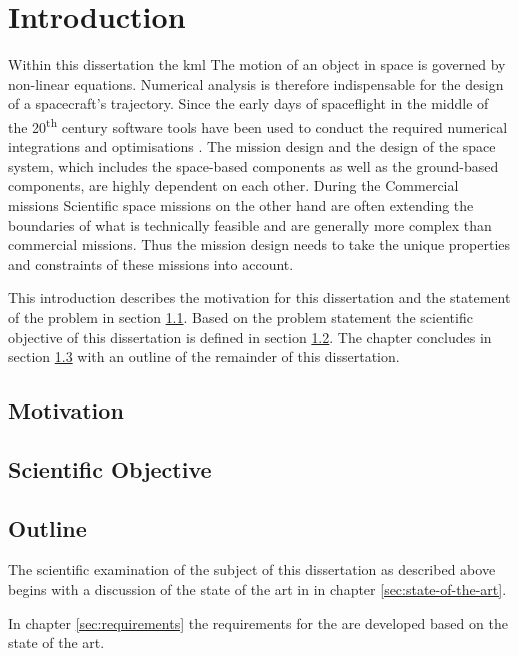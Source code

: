 \chapter{Introduction}
\label{sec:introduction}
Within this dissertation the \ac{kml}
The motion of an object in space is governed by non-linear equations.
Numerical analysis is therefore indispensable for the design of a spacecraft's trajectory.
Since the early days of spaceflight in the middle of the 20\textsuperscript{th} century software tools have been used to conduct the required numerical integrations and optimisations .
The mission design and the design of the space system, which includes the space-based components as well as the ground-based components, are highly dependent on each other.
During the 
Commercial missions
Scientific space missions on the other hand are often extending the boundaries of what is technically feasible and are generally more complex than commercial missions.
Thus the mission design needs to take the unique properties and constraints of these missions into account.



This introduction describes the motivation for this dissertation and the statement of the problem in section \ref{sec:motivation}.
Based on the problem statement the scientific objective of this dissertation is defined in section \ref{sec:scientific-objective}.
The chapter concludes in section \ref{sec:outline} with an outline of the remainder of this dissertation.

\section{Motivation}
\label{sec:motivation}

\section{Scientific Objective}
\label{sec:scientific-objective}

\section{Outline}
\label{sec:outline}
The scientific examination of the subject of this dissertation as described above begins with a discussion of the state of the art in  in chapter \ref{sec:state-of-the-art}.

In chapter \ref{sec:requirements} the requirements for the \topic are developed based on the state of the art.


